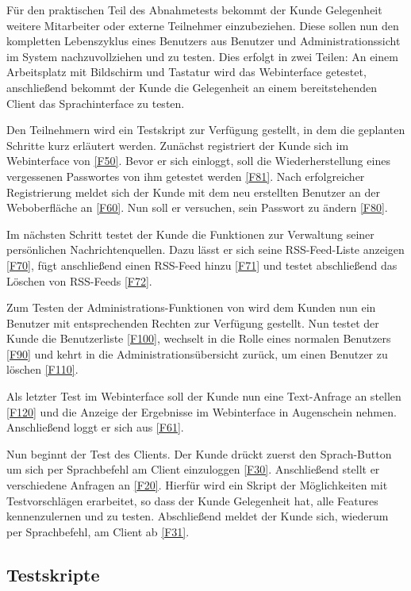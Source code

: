 Für den praktischen Teil des Abnahmetests bekommt der Kunde Gelegenheit weitere
Mitarbeiter oder externe Teilnehmer einzubeziehen. Diese sollen nun den
kompletten Lebenszyklus eines Benutzers aus Benutzer und Administrationssicht im
System nachzuvollziehen und zu testen. Dies erfolgt in zwei Teilen: An einem
Arbeitsplatz mit Bildschirm und Tastatur wird das Webinterface getestet,
anschließend bekommt der Kunde die Gelegenheit an einem bereitstehenden Client
das Sprachinterface zu testen.

Den Teilnehmern wird ein Testskript zur Verfügung gestellt, in dem die geplanten
Schritte kurz erläutert werden. Zunächst registriert der Kunde sich im
Webinterface von \NewsGenie \ref{F50}. Bevor er sich einloggt, soll die
Wiederherstellung eines vergessenen Passwortes von ihm getestet werden
\ref{F81}. Nach erfolgreicher Registrierung meldet sich der Kunde mit dem neu
erstellten Benutzer an der Weboberfläche an \ref{F60}. Nun soll er versuchen,
sein Passwort zu ändern \ref{F80}.

Im nächsten Schritt testet der Kunde die Funktionen zur Verwaltung seiner
persönlichen Nachrichtenquellen. Dazu lässt er sich seine RSS-Feed-Liste
anzeigen \ref{F70}, fügt anschließend einen RSS-Feed hinzu \ref{F71} und testet
abschließend das Löschen von RSS-Feeds \ref{F72}.

Zum Testen der Administrations-Funktionen von \NewsGenie wird dem Kunden nun ein
Benutzer mit entsprechenden Rechten zur Verfügung gestellt. Nun testet der Kunde
die Benutzerliste \ref{F100}, wechselt in die Rolle eines normalen Benutzers
\ref{F90} und kehrt in die Administrationsübersicht zurück, um einen Benutzer zu
löschen \ref{F110}.

Als letzter Test im Webinterface soll der Kunde nun eine Text-Anfrage an
\NewsGenie stellen \ref{F120} und die Anzeige der Ergebnisse im Webinterface in
Augenschein nehmen. Anschließend loggt er sich aus \ref{F61}.

Nun beginnt der Test des Clients. Der Kunde drückt zuerst den Sprach-Button um
sich per Sprachbefehl am Client einzuloggen \ref{F30}. Anschließend stellt er
verschiedene Anfragen an \NewsGenie \ref{F20}. Hierfür wird ein Skript der
Möglichkeiten mit Testvorschlägen erarbeitet, so dass der Kunde Gelegenheit hat,
alle Features kennenzulernen und zu testen. Abschließend meldet der Kunde sich,
wiederum per Sprachbefehl, am Client ab \ref{F31}.

\subsection{Testskripte}

